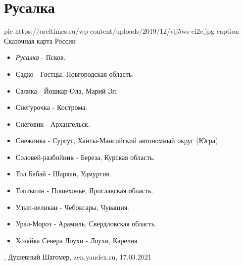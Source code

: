  
 
 
 
 
\chapter{Русалка}
\label{sec:slova.rusalka}

\ifcmt
  pic https://oreltimes.ru/wp-content/uploads/2019/12/vij5ws-ei2e.jpg
	caption Сказочная карта России
\fi
\begin{itemize}
  \item \emph{Русалка} - Псков.
  \item Садко - Гостцы, Новгородская область.
  \item Салика - Йошкар-Ола, Марий Эл.
  \item Снегурочка - Кострома.
  \item Снеговик - Архангельск.
  \item Снежинка - Сургут, Ханты-Мансийский автономный округ (Югра).
  \item Соловей-разбойник - Береза, Курская область.
  \item Тол Бабай - Шаркан, Удмуртия.
  \item Топтыгин - Пошехонье, Ярославская область.
  \item Улып-великан - Чебоксары, Чувашия.
  \item Урал-Мороз - Арамиль, Свердловская область.
  \item Хозяйка Севера Лоухи - Лоухи, Карелия
\end{itemize}
, 
Душевный Шагомер, zen.yandex.ru, 17.03.2021

